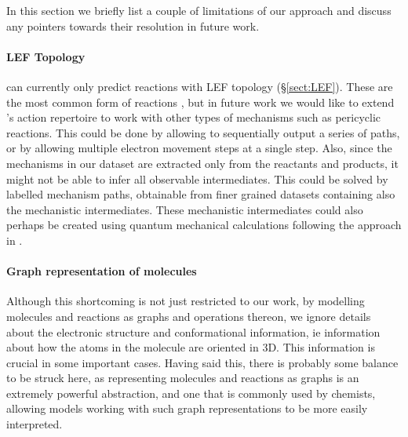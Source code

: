
In this section we briefly list a couple of limitations of our approach and discuss any pointers towards their resolution in future work.

\paragraph{LEF Topology}

\ourModel can currently only predict reactions with LEF topology (\S \ref{sect:LEF}). 
These are the most common form of reactions \citep{herges1994organizing}, but in future work we would like to extend \ourModel's action repertoire to work with other types of mechanisms such as pericyclic reactions.
 This could be done by allowing \ourModel to sequentially output a series of paths, or by allowing multiple electron movement steps at a single step. 
 Also, since the mechanisms in our dataset are extracted only from the reactants and products, it might not be able to infer all observable intermediates. This could be solved by labelled mechanism paths, obtainable from finer grained datasets containing also the mechanistic intermediates. 
 These mechanistic intermediates could also perhaps be created using quantum mechanical calculations following the approach in \citet{Sadowski2016-qg}.
 
 \paragraph{Graph representation of molecules}

 Although this shortcoming is not just restricted to our work, by modelling molecules and reactions as graphs and operations thereon, we ignore details about the electronic structure and conformational information, ie information about how the atoms in the molecule are oriented in 3D. 
 This information is crucial in some important cases.
 Having said this, there is probably some balance to be struck here, as representing molecules and reactions as graphs is an extremely powerful abstraction, and one that is commonly used by chemists, allowing models working with such graph representations to be more easily interpreted.


 
 
